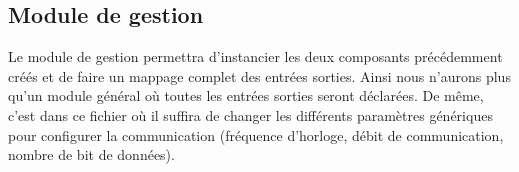 \subsection{Module de gestion}
Le module de gestion permettra d'instancier les deux composants précédemment créés et de faire un mappage complet des entrées sorties. Ainsi nous n'aurons plus qu'un module
général où toutes les entrées sorties seront déclarées. De même, c'est dans ce fichier où il suffira de changer les différents paramètres génériques pour configurer la communication
(fréquence d'horloge, débit de communication, nombre de bit de données).
